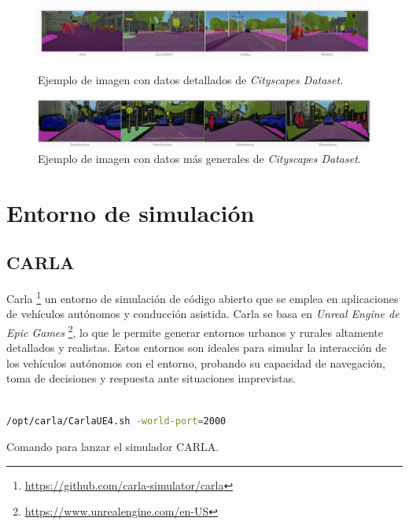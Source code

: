 \begin{figure}[ht]
  \begin{center}
    \includegraphics[width=15cm]{figs/Plataformas_Desarollo/detallado-ef.png}
    \caption{Ejemplo de imagen con datos detallados de \textit{Cityscapes Dataset}.}
    \label{foto_ef_detallado}
    
    \vspace{0.5cm} %
    
    \includegraphics[width=15cm]{figs/Plataformas_Desarollo/no_detallado_ef.png}
    \caption{Ejemplo de imagen con datos más generales de \textit{Cityscapes Dataset}.}
    \label{foto_ef_general}
  \end{center}
\end{figure}

\section{Entorno de simulación}
\label{sec:sim}
\subsection{CARLA}
\label{sec:carla}

Carla \footnote{\url{https://github.com/carla-simulator/carla}} un entorno de simulación de código abierto que se emplea en aplicaciones de vehículos autónomos y conducción asistida. Carla se basa en \textit{Unreal Engine de Epic Games} \footnote{\url{https://www.unrealengine.com/en-US}}, lo que le permite generar entornos urbanos y rurales altamente detallados y realistas. Estos entornos son ideales para simular la interacción de los vehículos autónomos con el entorno, probando su capacidad de navegación, toma de decisiones y respuesta ante situaciones imprevistas.

\begin{code}[h]
\begin{lstlisting}[language=bash]

/opt/carla/CarlaUE4.sh -world-port=2000

\end{lstlisting}
\caption[Comando para lanzar el simulador CARLA]{Comando para lanzar el simulador CARLA.}
\label{cod:cmdcarla}
\end{code}

